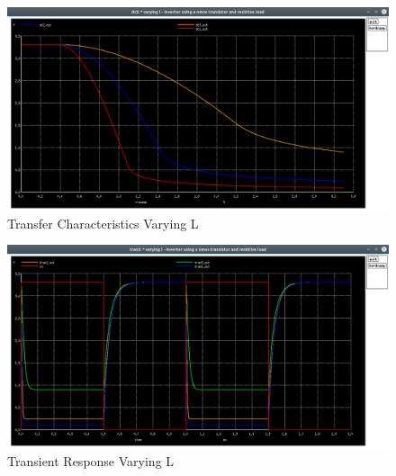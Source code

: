 \documentclass[12pt, a4paper]{article}
\begin{document}
	\begin{figure}[H]
		\begin{center}
			\includegraphics[scale=0.25]{images/inverter_l_dc.png}
			\caption{Transfer Characteristics Varying L}
			\label{fig::varying_l_dc}
		\end{center}
	\end{figure}
	\begin{figure}[H]
		\begin{center}
			\includegraphics[scale=0.25]{images/inverter_l_tran.png}
			\caption{Transient Response Varying L}
			\label{fig::varying_l_time}
		\end{center}
	\end{figure}
	
\end{document}
